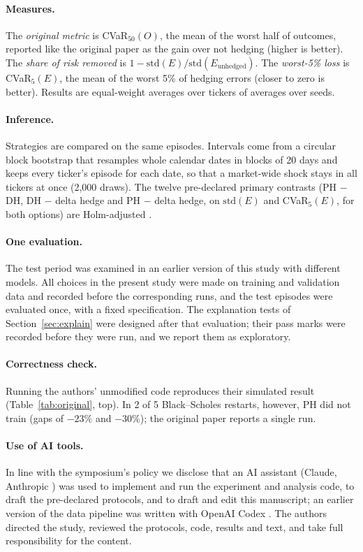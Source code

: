 \documentclass[runningheads]{llncs}
\begin{document}
\paragraph{Measures.} The \emph{original metric} is CVaR$_{50}(O)$, the mean of the worst half of outcomes,
reported like the original paper as the gain over not hedging (higher is better). The \emph{share of risk
removed} is $1-\mathrm{std}(E)/\mathrm{std}(E_{\mathrm{unhedged}})$. The \emph{worst-5\% loss} is
CVaR$_5(E)$, the mean of the worst 5\% of hedging errors (closer to zero is better). Results are equal-weight
averages over tickers of averages over seeds.

\paragraph{Inference.} Strategies are compared on the same episodes. Intervals come from a circular block
bootstrap \cite{politis1992} that resamples whole calendar dates in blocks of 20 days and keeps every
ticker's episode for each date, so that a market-wide shock stays in all tickers at once (2,000 draws). The
twelve pre-declared primary contrasts (PH $-$ DH, DH $-$ delta hedge and PH $-$ delta hedge, on
$\mathrm{std}(E)$ and CVaR$_5(E)$, for both options) are Holm-adjusted \cite{holm1979simple}.

\paragraph{One evaluation.} The test period was examined in an earlier version of this study with different
models. All choices in the present study were made on training and validation data and recorded before the
corresponding runs, and the test episodes were evaluated once, with a fixed specification. The explanation
tests of Section~\ref{sec:explain} were designed after that evaluation; their pass marks were recorded before
they were run, and we report them as exploratory.

\paragraph{Correctness check.} Running the authors' unmodified code reproduces their simulated result
(Table~\ref{tab:original}, top). In 2 of 5 Black--Scholes restarts, however, PH did not train (gaps of
$-23\%$ and $-30\%$); the original paper reports a single run.

\paragraph{Use of AI tools.} In line with the symposium's policy we disclose that an AI assistant (Claude,
Anthropic \cite{anthropicClaude2026}) was used to implement and run the experiment and analysis code, to
draft the pre-declared protocols, and to draft and edit this manuscript; an earlier version of the data
pipeline was written with OpenAI Codex \cite{openaiCodex2026}. The authors directed the study, reviewed the
protocols, code, results and text, and take full responsibility for the content.
\end{document}

